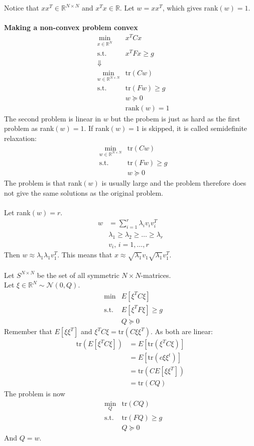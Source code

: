 \documentclass[12pt,a4paper]{report}
\begin{document}
Notice that $xx^T\in\mathbb{R}^{N\times N}$ and $x^Tx\in\mathbb{R}$. Let $w=xx^T$, which gives rank$(w)=1$.\\\\
\textbf{Making a non-convex problem convex}
\begin{align*}
&\underset{x\in\mathbb{R}^N}\min&x^TCx\\
&\text{s.t.}&x^TFx\geq g\\
&\Downarrow\\
&\underset{w\in\mathbb{R}^{N\times N}}\min&\text{tr}(Cw)\\
&\text{s.t.}&\text{tr}(Fw)\geq g\\
& &w\succeq0\\
& & \text{rank}(w)=1
\end{align*}
The second problem is linear in $w$ but the probem is just as hard as the first problem as rank$(w)=1$. If rank$(w)=1$ is skipped, it is called semidefinite relaxation:
\begin{align*}
&\underset{w\in\mathbb{R}^{N\times N}}\min&\text{tr}(Cw)\\
&\text{s.t.}&\text{tr}(Fw)\geq g\\
& &w\succeq0
\end{align*}
The problem is that rank$(w)$ is usually large and the problem therefore does not give the same solutions as the original problem.\\\\
Let rank$(w)=r$.
\begin{align*}
w&=\sum_{i=1}^r\lambda_iv_iv_i^T\\
&\lambda_1\geq\lambda_2\geq\ldots\geq\lambda_r\\
&v_i,\,i=1,\ldots,r
\end{align*}
Then $w\approx\lambda_1\lambda_1v_1^T$. This means that $x\approx\sqrt{\lambda_1}v_1\sqrt{\lambda_1}v_1^T$.\\\\
Let $S^{N\times N}$ be the set of all symmetric $N\times N$-matrices.\\
Let $\xi\in\mathbb{R}^N\sim\mathcal{N}(0,Q)$.
\begin{align*}
&\min&E\left[\xi^TC\xi\right]\\
&\text{s.t.}&E[\xi^TF\xi]\geq g\\
& &Q\succeq0
\end{align*}
Remember that $E\left[\xi\xi^T\right]$ and $\xi^TC\xi=\text{tr}(C\xi\xi^T)$. As both are linear:
\begin{align*}
\text{tr}\left(E\left[\xi^TC\xi\right]\right)&=E\left[\text{tr}\left(\xi^TC\xi\right)\right]\\
&=E\left[\text{tr}\left(c\xi\xi^t\right)\right]\\
&=\text{tr}\left(CE\left[\xi\xi^T\right]\right)\\
&=\text{tr}(CQ)
\end{align*}
The problem is now
\begin{align*}
&\underset{Q}\min&\text{tr}(CQ)\\
&\text{s.t.}&\text{tr}(FQ)\geq g\\
& &Q\succeq0
\end{align*}
And $Q=w$.
\end{document}
